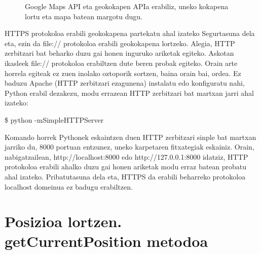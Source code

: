 \begin{figure}[ht]
	\centering
{}
\caption{Google Maps API eta geokokapen APIa erabiliz, uneko kokapena lortu eta mapa batean margotu dugu.}
\label{fig:kokapenagooglemaps}
\end{figure}

\begin{alertinfo}{HTTPS protokoloa erabili geokokapena partekatu ahal izateko}
       Segurtasuna dela eta, ezin da file:// protokoloa erabili geokokapena lortzeko. Alegia, HTTP zerbitzari bat beharko duzu gai honen inguruko ariketak egiteko. Askotan ikasleek file:// protokoloa erabiltzen dute beren probak egiteko. Orain arte horrela egiteak ez zuen inolako oztoporik sortzen, baina orain bai, ordea. Ez baduzu Apache (HTTP zerbitzari ezagunena) instalatu edo konfiguratu nahi, Python erabil dezakezu, modu errazean HTTP zerbitzari bat martxan jarri ahal izateko:

       \$ python -mSimpleHTTPServer 

Komando horrek Pythonek eskaintzen duen HTTP zerbitzari sinple bat martxan jarriko du, 8000 portuan entzunez, uneko karpetaren fitxategiak eskainiz. Orain, nabigatzailean, http://localhost:8000 edo http://127.0.0.1:8000 idatziz, HTTP protokoloa erabili ahalko duzu gai honen ariketak modu erraz batean probatu ahal izateko. Pribatutasuna dela eta, HTTPS da erabili beharreko protokoloa localhost domeinua ez badugu erabiltzen.
\end{alertinfo}

\section{Posizioa lortzen. getCurrentPosition metodoa}


